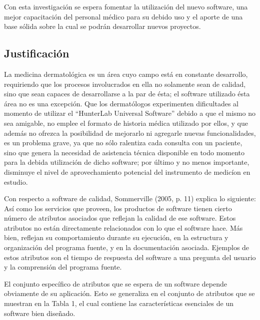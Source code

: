 \documentclass[12pt, a4paper]{article}
\begin{document}
Con esta investigaci\'{o}n se espera fomentar la utilizaci\'{o}n del nuevo software, una mejor capacitaci\'{o}n del personal m\'{e}dico para su debido uso y el aporte de una base s\'{o}lida sobre la cual se podr\'{a}n desarrollar nuevos proyectos.

\subsection{Justificaci\'{o}n}
La medicina dermatol\'{o}gica es un \'{a}rea cuyo campo est\'{a} en constante desarrollo, requiriendo que los procesos involucrados en ella no solamente sean de calidad, sino que sean capaces de desarrollarse a la par de \'{e}sta; el software utilizado \'{e}sta \'{a}rea no es una excepci\'{o}n. Que los dermat\'{o}logos experimenten dificultades al momento de utilizar el ``HunterLab Universal Software'' debido a que el mismo no sea amigable, no emplee el formato de historia m\'{e}dica utilizado por ellos, y que adem\'{a}s no ofrezca la posibilidad de mejorarlo ni agregarle nuevas funcionalidades, es un problema grave, ya que no s\'{o}lo ralentiza cada consulta con un paciente, sino que genera la necesidad de asistencia t\'{e}cnica disponible en todo momento para la debida utilizaci\'{o}n de dicho software; por \'{u}ltimo y no menos importante, disminuye el nivel de aprovechamiento potencial del instrumento de medic\'{i}on en estudio.

Con respecto a software de calidad, Sommerville (2005, p. 11) explica lo siguiente: As\'{i} como los servicios que proveen, los productos de software tienen cierto n\'{u}mero de atributos asociados que reflejan la calidad de ese software. Estos atributos no est\'{a}n directamente relacionados con lo que el software hace. M\'{a}s bien, reflejan su comportamiento durante su ejecuci\'{o}n, en la estructura y organizaci\'{o}n del programa fuente, y en la documentaci\'{o}n asociada. Ejemplos de estos atributos son el tiempo de respuesta del software a una pregunta del usuario y la comprensi\'{o}n del programa fuente.

El conjunto espec\'{i}fico de atributos que se espera de un software depende obviamente de su aplicaci\'{o}n. Esto se generaliza en el conjunto de atributos que se muestran en la Tabla 1, el cual contiene las caracter\'{i}sticas esenciales de un software bien dise\~{n}ado.
\end{document}
